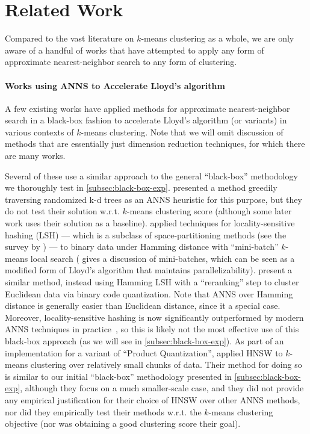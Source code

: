 \section{Related Work}
\label{subsec:related}

Compared to the vast literature on $k$-means clustering as a whole,
we are only aware of a handful of works that have attempted to apply
any form of approximate nearest-neighbor search to any form of clustering.

\paragraph{Works using ANNS to Accelerate Lloyd's algorithm}
A few existing works have applied
methods for approximate nearest-neighbor search
in a black-box fashion
to accelerate Lloyd's algorithm (or variants)
in various contexts of $k$-means clustering.
Note that we will omit discussion of methods
that are essentially just dimension reduction techniques,
for which there are many works.

Several of these use a similar approach to
the general ``black-box'' methodology
we thoroughly test in
\cref{subsec:black-box-exp}.
\citet{PhilbinCISZ07} presented a method
greedily traversing randomized k-d trees as an ANNS heuristic for this purpose,
but they do not test their solution
w.r.t. $k$-means clustering score
(although some later work uses their solution as a baseline).
\citet{GongPYBBF15} applied techniques for
locality-sensitive hashing
(LSH)
--- which is a subclass of
space-partitioning methods (see the survey by \citet{lshsurvey}) --- 
to binary data under Hamming distance
with ``mini-batch'' $k$-means local search
(\citet{Sculley10} gives a discussion of mini-batches,
which can be seen as a modified form of Lloyd's algorithm
that maintains parallelizability).
\citet{HuWBZC17} present a similar method,
instead using Hamming LSH with a ``reranking'' step
to cluster Euclidean data via binary code quantization.
Note that ANNS over Hamming distance is generally easier than
Euclidean distance, since it a special case.
Moreover, locality-sensitive hashing
is now significantly outperformed
by modern ANNS techniques in practice~\cite{aumuller2020ann},
so this is likely not the most effective use of this black-box approach
(as we will see in \cref{subsec:black-box-exp}).
As part of an implementation
for a variant of ``Product Quantization'',
\citet{baranchuk2018revisiting} applied
HNSW to $k$-means clustering over
relatively small chunks of data.
Their method for doing so
is similar to our initial ``black-box'' methodology
presented in
\cref{subsec:black-box-exp},
although they focus on a much smaller-scale case,
and they did not provide any empirical justification
for their choice of HNSW over other ANNS methods,
nor did they empirically test their methods w.r.t. the $k$-means clustering objective
(nor was obtaining a good clustering score their goal).

